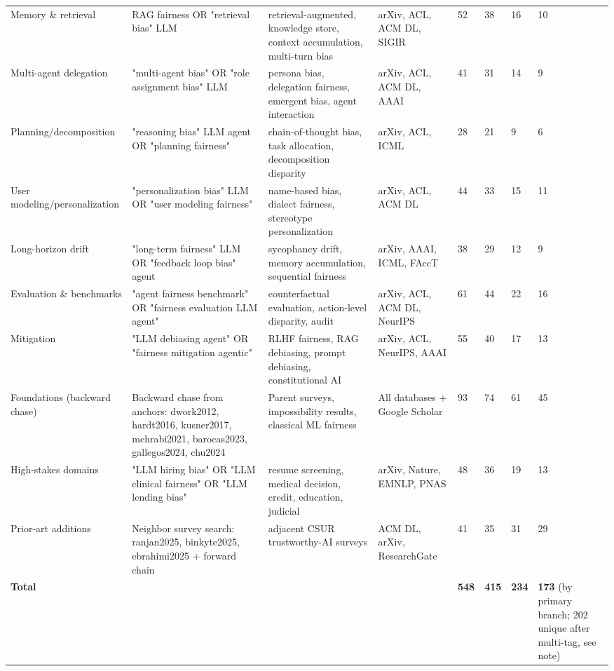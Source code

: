 \documentclass[acmsmall,nonacm]{acmart}
\begin{document}
\begin{longtable}{|p{}|p{}|p{}|p{}|p{}|p{}|p{}|p{}|}
Memory \& retrieval & RAG fairness OR "retrieval bias" LLM & retrieval-augmented, knowledge store, context accumulation, multi-turn bias & arXiv, ACL, ACM DL, SIGIR & 52 & 38 & 16 & 10 \\
Multi-agent delegation & "multi-agent bias" OR "role assignment bias" LLM & persona bias, delegation fairness, emergent bias, agent interaction & arXiv, ACL, ACM DL, AAAI & 41 & 31 & 14 & 9 \\
Planning\allowbreak/\allowbreak decomposition & "reasoning bias" LLM agent OR "planning fairness" & chain-of-thought bias, task allocation, decomposition disparity & arXiv, ACL, ICML & 28 & 21 & 9 & 6 \\
User modeling\allowbreak/\allowbreak personalization & "personalization bias" LLM OR "user modeling fairness" & name-based bias, dialect fairness, stereotype personalization & arXiv, ACL, ACM DL & 44 & 33 & 15 & 11 \\
Long-horizon drift & "long-term fairness" LLM OR "feedback loop bias" agent & sycophancy drift, memory accumulation, sequential fairness & arXiv, AAAI, ICML, FAccT & 38 & 29 & 12 & 9 \\
Evaluation \& benchmarks & "agent fairness benchmark" OR "fairness evaluation LLM agent" & counterfactual evaluation, action-level disparity, audit & arXiv, ACL, ACM DL, NeurIPS & 61 & 44 & 22 & 16 \\
Mitigation & "LLM debiasing agent" OR "fairness mitigation agentic" & RLHF fairness, RAG debiasing, prompt debiasing, constitutional AI & arXiv, ACL, NeurIPS, AAAI & 55 & 40 & 17 & 13 \\
Foundations (backward chase) & Backward chase from anchors: dwork2012, hardt2016, kusner2017, mehrabi2021, barocas2023, gallegos2024, chu2024 & Parent surveys, impossibility results, classical ML fairness & All databases + Google Scholar & 93 & 74 & 61 & 45 \\
High-stakes domains & "LLM hiring bias" OR "LLM clinical fairness" OR "LLM lending bias" & resume screening, medical decision, credit, education, judicial & arXiv, Nature, EMNLP, PNAS & 48 & 36 & 19 & 13 \\
Prior-art additions & Neighbor survey search: ranjan2025, binkyte2025, ebrahimi2025 + forward chain & adjacent CSUR trustworthy-AI surveys & ACM DL, arXiv, ResearchGate & 41 & 35 & 31 & 29 \\
\midrule
\textbf{Total} &  &  &  & \textbf{548} & \textbf{415} & \textbf{234} & \textbf{173} (by primary branch; 202 unique after multi-tag, see note) \\
\end{longtable}
\endgroup
\end{document}
